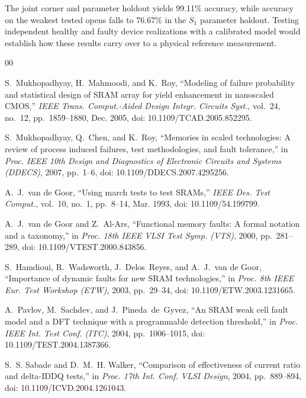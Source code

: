 \documentclass[conference]{IEEEtran}
\begin{document}
The joint corner and parameter holdout yields 99.11\% accuracy, while accuracy on the weakest tested opens falls to 76.67\% in the $S_1$ parameter holdout. Testing independent healthy and faulty device realizations with a calibrated model would establish how these results carry over to a physical reference measurement.

\balance

\begin{thebibliography}{00}

S.~Mukhopadhyay, H.~Mahmoodi, and K.~Roy, ``Modeling of failure probability and statistical design of SRAM array for yield enhancement in nanoscaled CMOS,'' \emph{IEEE Trans. Comput.-Aided Design Integr. Circuits Syst.}, vol.~24, no.~12, pp.~1859--1880, Dec. 2005, doi: 10.1109/TCAD.2005.852295.

S.~Mukhopadhyay, Q.~Chen, and K.~Roy, ``Memories in scaled technologies: A review of process induced failures, test methodologies, and fault tolerance,'' in \emph{Proc. IEEE 10th Design and Diagnostics of Electronic Circuits and Systems (DDECS)}, 2007, pp.~1--6, doi: 10.1109/DDECS.2007.4295256.

A.~J.~van de Goor, ``Using march tests to test SRAMs,'' \emph{IEEE Des. Test Comput.}, vol.~10, no.~1, pp.~8--14, Mar. 1993, doi: 10.1109/54.199799.

A.~J.~van de Goor and Z.~Al-Ars, ``Functional memory faults: A formal notation and a taxonomy,'' in \emph{Proc. 18th IEEE VLSI Test Symp. (VTS)}, 2000, pp.~281--289, doi: 10.1109/VTEST.2000.843856.

S.~Hamdioui, R.~Wadsworth, J.~Delos~Reyes, and A.~J.~van de Goor, ``Importance of dynamic faults for new SRAM technologies,'' in \emph{Proc. 8th IEEE Eur. Test Workshop (ETW)}, 2003, pp.~29--34, doi: 10.1109/ETW.2003.1231665.

A.~Pavlov, M.~Sachdev, and J.~Pineda~de~Gyvez, ``An SRAM weak cell fault model and a DFT technique with a programmable detection threshold,'' in \emph{Proc. IEEE Int. Test Conf. (ITC)}, 2004, pp.~1006--1015, doi: 10.1109/TEST.2004.1387366.

S.~S. Sabade and D.~M.~H. Walker, ``Comparison of effectiveness of current ratio and delta-IDDQ tests,'' in \emph{Proc. 17th Int. Conf. VLSI Design}, 2004, pp.~889--894, doi: 10.1109/ICVD.2004.1261043.


\end{thebibliography}
\end{document}
